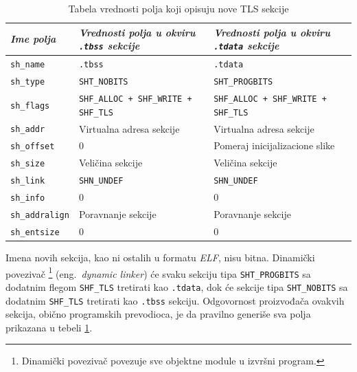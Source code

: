 \documentclass[12pt,oneside]{memoir}
\begin{document}
\begin{table}[H]
		\begin{center}
	\begin{tabular}{ | l | p{5cm} | p{5cm} |}
		\hline
		\emph{Ime polja} & \emph{Vrednosti polja u okviru \texttt{.tbss} sekcije} & \emph{Vrednosti polja u okviru \texttt{.tdata} sekcije} \\ \hline
		\texttt{sh\_name} & \texttt{.tbss} & \texttt{.tdata} \\ \hline
		\texttt{sh\_type} & \texttt{SHT\_NOBITS} & \texttt{SHT\_PROGBITS} \\ \hline
		\texttt{sh\_flags} & \texttt{SHF\_ALLOC + SHF\_WRITE + SHF\_TLS} & \texttt{SHF\_ALLOC + SHF\_WRITE + SHF\_TLS} \\ \hline
		\texttt{sh\_addr} & Virtualna adresa sekcije & Virtualna adresa sekcije \\ \hline
		\texttt{sh\_offset} & 0 & Pomeraj inicijalizacione slike \\ \hline
		\texttt{sh\_size} & Veličina sekcije & Veličina sekcije \\ \hline
		\texttt{sh\_link} & \texttt{SHN\_UNDEF} & \texttt{SHN\_UNDEF} \\ \hline
		\texttt{sh\_info} & 0 & 0 \\ \hline
		\texttt{sh\_addralign} & Poravnanje sekcije & Poravnanje sekcije \\ \hline
		\texttt{sh\_entsize} & 0 & 0 \\ \hline
	\end{tabular}
	\end{center}
	\caption{\label{tab:tls_secs}Tabela vrednosti polja koji opisuju nove TLS sekcije}
\end{table}

Imena novih sekcija, kao ni ostalih u formatu \emph{ELF}, nisu bitna. Dinamički povezivač \footnote{Dinamički povezivač povezuje sve objektne module u izvršni program.} (eng.~\emph{dynamic linker}) će svaku sekciju tipa \texttt{SHT\_PROGBITS} sa dodatnim flegom \texttt{SHF\_TLS} tretirati kao \texttt{.tdata}, dok će sekcije tipa \texttt{SHT\_NOBITS} sa dodatnim \texttt{SHF\_TLS} tretirati kao \texttt{.tbss} sekciju. Odgovornost proizvođača ovakvih sekcija, obično programskih prevodioca, je da pravilno generiše sva polja prikazana u tebeli \ref{tab:tls_secs}.
\end{document}
